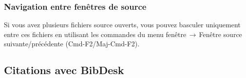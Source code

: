 \documentclass[11pt,french]{article}
\newcommand{\TS}{\textsf{\TeX Shop}}
\newcommand{\acr}[1]{\textsf{#1}}
\newcommand{\cmd}[1]{\textsf{#1}}
\newcommand{\mnu}[1]{\textsf{#1}}
\newcommand{\To}{\,\(\to\)\,}
\begin{document}
%

\subsubsection{Navigation entre fenêtres de source}

Si vous avez plusieurs fichiers source ouverts, vous pouvez basculer uniquement entre ces fichiers en utilisant les commandes du menu \mnu{fenêtre}\To\mnu{Fenêtre source suivante/précédente} (\cmd{Cmd-F2}/\cmd{Maj-Cmd-F2}).


\subsection{Citations avec \cmd{BibDesk}}
\end{document}
